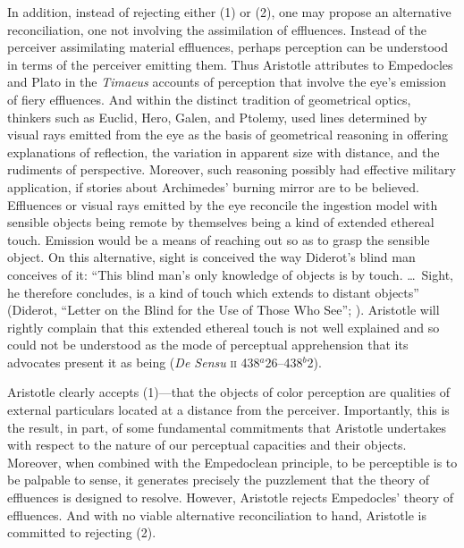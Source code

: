 In addition, instead of rejecting either (1) or (2), one may propose an alternative reconciliation, one not involving the assimilation of effluences. Instead of the perceiver assimilating material effluences, perhaps perception can be understood in terms of the perceiver emitting them. Thus Aristotle attributes to Empedocles and Plato in the \emph{Timaeus} accounts of perception that involve the eye's emission of fiery effluences. And within the distinct tradition of geometrical optics, thinkers such as Euclid, Hero, Galen, and Ptolemy, used lines determined by visual rays emitted from the eye as the basis of geometrical reasoning in offering explanations of reflection, the variation in apparent size with distance, and the rudiments of perspective. Moreover, such reasoning possibly had effective military application, if stories about Archimedes' burning mirror are to be believed. Effluences or visual rays emitted by the eye reconcile the ingestion model with sensible objects being remote by themselves being a kind of extended ethereal touch. Emission would be a means of reaching out so as to grasp the sensible object. On this alternative, sight is conceived the way Diderot's blind man conceives of it: ``This blind man's only knowledge of objects is by touch. \ldots\ Sight, he therefore concludes, is a kind of touch which extends to distant objects'' (Diderot, ``Letter on the Blind for the Use of Those Who See''; \citealt[72]{Jourdain:1916aa}). Aristotle will rightly complain that this extended ethereal touch is not well explained and so could not be understood as the mode of perceptual apprehension that its advocates present it as being (\emph{De Sensu} \textsc{ii} 438\( ^{a} \)26--438\( ^{b} \)2).

Aristotle clearly accepts (1)---that the objects of color perception are qualities of external particulars located at a distance from the perceiver. Importantly, this is the result, in part, of some fundamental commitments that Aristotle undertakes with respect to the nature of our perceptual capacities and their objects. Moreover, when combined with the Empedoclean principle, to be perceptible is to be palpable to sense, it generates precisely the puzzlement that the theory of effluences is designed to resolve. However, Aristotle rejects Empedocles' theory of effluences. And with no viable alternative reconciliation to hand, Aristotle is committed to rejecting (2).

